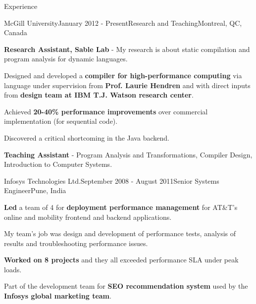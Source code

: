 \documentclass{resume} %
\begin{document}
\begin{rSection}{Experience}
\begin{rSubsection}{McGill University}{January 2012 - Present}{Research and Teaching}{Montreal, QC, Canada}
\item \textbf{Research Assistant, Sable Lab} - My research is about static compilation and program analysis for dynamic languages.
\begin{lsubSubsection}
	\item Designed and developed a \textbf{\matlab compiler for high-performance computing} via \xten language under supervision from \textbf{Prof. Laurie Hendren} and with direct inputs from \textbf{\xten design team at IBM T.J. Watson research center}.
	\item Achieved \textbf{20-40\% performance improvements} over commercial \matlab implementation (for sequential code).
	\item Discovered a critical shortcoming in the \xten Java backend.
\end{lsubSubsection}
\item \textbf{Teaching Assistant} - Program Analysis and Transformations,
	Compiler Design, Introduction to Computer Systems.
\end{rSubsection}

\begin{rSubsection}{Infosys Technologies Ltd.}{September 2008 - August 2011}{Senior Systems Engineer}{Pune, India}
\item \textbf{Led} a team of 4 for \textbf{deployment performance management} for AT\&T's online and mobility frontend and backend applications.
\begin{lsubSubsection}
\item My team's job was design and development of performance tests, analysis of results and troubleshooting performance issues.
\item \textbf{Worked on 8 projects} and they all exceeded performance SLA under peak loads.
\end{lsubSubsection}
\item Part of the development team for \textbf{SEO recommendation system} used by the \textbf{Infosys global marketing team}.
\end{rSubsection}


\end{rSection}
\end{document}
